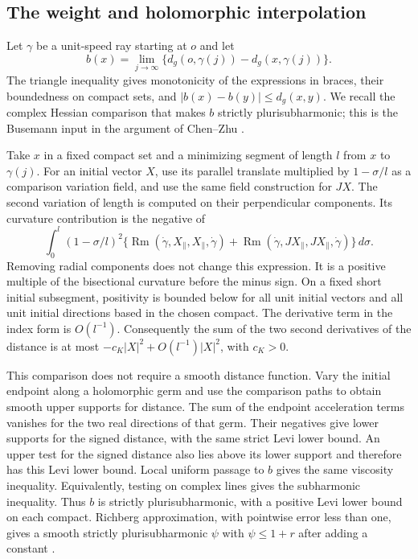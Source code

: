 \documentclass[11pt]{article}
\theoremstyle{definition}
\theoremstyle{remark}
\DeclareMathOperator{\Rm}{Rm}
\numberwithin{equation}{section}
\begin{document}
\subsection{The weight and holomorphic interpolation}

Let $\gamma$ be a unit-speed ray starting at $o$ and let
\[
 b(x)=\lim_{j\to\infty}\{d_g(o,\gamma(j))-d_g(x,\gamma(j))\}.
\]
The triangle inequality gives monotonicity of the expressions in braces,
their boundedness on compact sets, and $|b(x)-b(y)|\le d_g(x,y)$.
We recall the complex Hessian comparison that makes $b$ strictly
plurisubharmonic; this is the Busemann input in the argument of
Chen--Zhu \cite[Section~2]{ChenZhu}.

Take $x$ in a fixed compact set and a minimizing segment of length $l$
from $x$ to $\gamma(j)$.  For an initial vector $X$, use its parallel
translate multiplied by $1-\sigma/l$ as a comparison variation field,
and use the same field construction for $JX$.  The second variation of
length is computed on their perpendicular components.  Its curvature
contribution is the negative of
\[
 \int_0^l(1-\sigma/l)^2
 \{\Rm(\dot\gamma,X_\parallel,X_\parallel,\dot\gamma)
   +\Rm(\dot\gamma,JX_\parallel,JX_\parallel,\dot\gamma)\}
 \,d\sigma.
\]
Removing radial components does not change this expression.  It is a
positive multiple of the bisectional curvature before the minus sign.
On a fixed short initial subsegment, positivity is bounded below for
all unit initial vectors and all unit initial directions based in the
chosen compact.  The derivative term in the index form is $O(l^{-1})$.
Consequently the sum of the two second derivatives of the distance is
at most $-c_K|X|^2+O(l^{-1})|X|^2$, with $c_K>0$.

This comparison does not require a smooth distance function.  Vary the
initial endpoint along a holomorphic germ and use the comparison paths
to obtain smooth upper supports for distance.  The sum of the endpoint
acceleration terms vanishes for the two real directions of that germ.
Their negatives give lower supports for the signed distance, with the
same strict Levi lower bound.  An upper test for the signed distance
also lies above its lower support and therefore has this Levi lower
bound.  Local uniform passage to $b$ gives the same viscosity inequality.
Equivalently, testing on complex lines gives the subharmonic
inequality.  Thus $b$ is strictly plurisubharmonic, with a positive Levi
lower bound on each compact.  Richberg approximation, with pointwise
error less than one, gives a smooth strictly plurisubharmonic $\psi$
with $\psi\le1+r$ after adding a constant
\cite{Richberg}\cite[Section~4, Corollary~2]{GreeneWu}.
\end{document}
